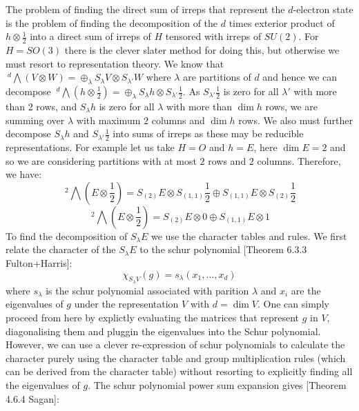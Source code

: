 \documentclass{article}
\begin{document}
The problem of finding the direct sum of irreps that represent the $d$-electron state is the problem of finding the decomposition of the $d$ times exterior product of $h \otimes\frac{1}{2}$ into a direct sum of irreps of $H$ tensored with irreps of $SU(2)$. For $H=SO(3)$ there is the clever slater method for doing this, but otherwise we must resort to representation theory. We know that $\>^d\bigwedge (V\otimes W)= \oplus_{\lambda} S_{\lambda} V \otimes S_{\lambda'}W$ where $\lambda$ are partitions of $d$ and hence we can decompose $\>^d\bigwedge (h\otimes \frac{1}{2})=\oplus_{\lambda}S_{\lambda} h \otimes S_{\lambda'}\frac{1}{2}$. As $S_{\lambda'}\frac{1}{2}$ is zero for all $\lambda'$ with more than 2 rows, and $S_{\lambda}h$ is zero for all $\lambda$ with more than $\dim h$ rows, we are summing over $\lambda$ with maximum $2$ columns and $\dim h$ rows. We also must further decompose $S_{\lambda} h$ and $S_{\lambda'}\frac{1}{2}$ into sums of irreps as these may be reducible representations. For example let us take $H=O$ and $h =E$, here $\dim E = 2$ and so we are considering partitions with at most $2$ rows and $2$ columns. Therefore, we have:
\begin{equation}
    \>^2\bigwedge (E\otimes \frac{1}{2}) = S_{(2)} E \otimes S_{(1,1)}\frac{1}{2} \oplus S_{(1,1)} E \otimes S_{(2)}\frac{1}{2}
\end{equation}
\begin{equation}
    \>^2\bigwedge (E\otimes \frac{1}{2}) = S_{(2)} E \otimes 0 \oplus S_{(1,1)} E \otimes 1
\end{equation}
To find the decomposition of $S_{\lambda} E$ we use the character tables and rules. We first relate the character of the $S_{\lambda} E$ to the schur polynomial [Theorem 6.3.3 Fulton+Harris]:
\begin{equation}
    \chi_{S_{\lambda}V}(g) = s_{\lambda}(x_1,\ldots,x_d)
\end{equation}
where $s_{\lambda}$ is the schur polynomial associated with parition $\lambda$ and $x_i$ are the eigenvalues of $g$ under the representation $V$ with $d = \dim V$. One can simply proceed from here by explictly evaluating the matrices that represent $g$ in $V$, diagonalising them and pluggin the eigenvalues into the Schur polynomial. However, we can use a clever re-expression of schur polynomials to calculate the character purely using the character table and group multiplication rules (which can be derived from the character table) without resorting to explicitly finding all the eigenvalues of $g$. The schur polynomial power sum expansion gives [Theorem 4.6.4 Sagan]:
\end{document}
